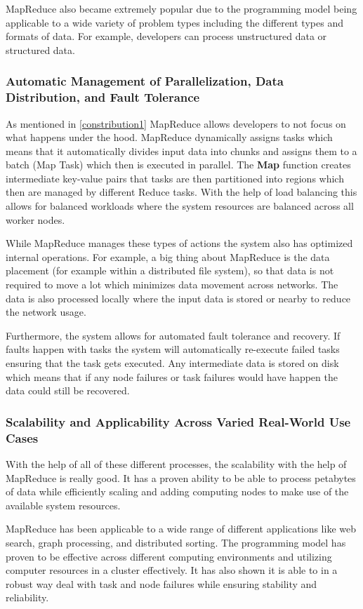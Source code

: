 \documentclass[10pt]{proc}
\begin{document}
MapReduce also became extremely popular due to the programming model being applicable to a wide variety of problem types including the different types and formats of data. For example, developers can process unstructured data or structured data. 

\subsubsection{Automatic Management of Parallelization, Data Distribution, and Fault Tolerance}
As mentioned in \ref{constribution1} MapReduce allows developers to not focus on what happens under the hood. MapReduce dynamically assigns tasks which means that it automatically divides input data into chunks and assigns them to a batch (Map Task) which then is executed in parallel. The  \textbf{Map} function creates intermediate key-value pairs that tasks are then partitioned into regions which then are managed by different Reduce tasks. With the help of load balancing this allows for balanced workloads where the system resources are balanced across all worker nodes.

While MapReduce manages these types of actions the system also has optimized internal operations. For example, a big thing about MapReduce is the data placement (for example within a distributed file system), so that data is not required to move a lot which minimizes data movement across networks. The data is also processed locally where the input data is stored or nearby to reduce the network usage.

Furthermore, the system allows for automated fault tolerance and recovery. If faults happen with tasks the system will automatically re-execute failed tasks ensuring that the task gets executed. Any intermediate data is stored on disk which means that if any node failures or task failures would have happen the data could still be recovered.

\subsubsection{Scalability and Applicability Across Varied Real-World Use Cases}
With the help of all of these different processes, the scalability with the help of MapReduce is really good. It has a proven ability to be able to process petabytes of data while efficiently scaling and adding computing nodes to make use of the available system resources.

MapReduce has been applicable to a wide range of different applications like web search, graph processing, and distributed sorting. The programming model has proven to be effective across different computing environments and utilizing computer resources in a cluster effectively. It has also shown it is able to in a robust way deal with task and node failures while ensuring stability and reliability.
\end{document}
